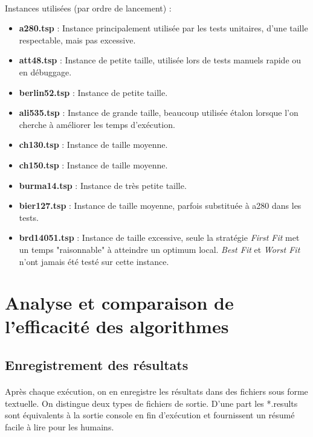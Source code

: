 \documentclass[a4paper,10pt]{report}
\begin{document}
\paragraph{}
Instances utilisées (par ordre de lancement) :
\begin{itemize}
  \item \textbf{a280.tsp} : Instance principalement utilisée par les tests
unitaires, d'une taille respectable, mais pas excessive.
  \item \textbf{att48.tsp} : Instance de petite taille, utilisée lors de tests
manuels rapide ou en débuggage.
  \item \textbf{berlin52.tsp} : Instance de petite taille.
  \item \textbf{ali535.tsp} : Instance de grande taille, beaucoup utilisée
étalon lorsque l'on cherche à améliorer les temps d'exécution.
  \item \textbf{ch130.tsp} : Instance de taille moyenne.
  \item \textbf{ch150.tsp} : Instance de taille moyenne.
  \item \textbf{burma14.tsp} : Instance de très petite taille.
  \item \textbf{bier127.tsp} : Instance de taille moyenne, parfois substituée à
a280 dans les tests.
  \item \textbf{brd14051.tsp} : Instance de taille excessive, seule la stratégie
\textit{First Fit} met un temps "raisonnable" à atteindre un optimum local.
\textit{Best Fit} et \textit{Worst Fit} n'ont jamais été testé sur cette
instance.
\end{itemize}

\pagebreak
\section{Analyse et comparaison de l'efficacité des algorithmes}
\subsection{Enregistrement des résultats}

\paragraph{}
  Après chaque exécution, on en enregistre les résultats dans des fichiers sous
forme textuelle. On distingue deux types de fichiers de sortie. D'une part les
*.results sont équivalents à la sortie console en fin d'exécution et
fournissent un résumé facile à lire pour les humains.
\end{document}

